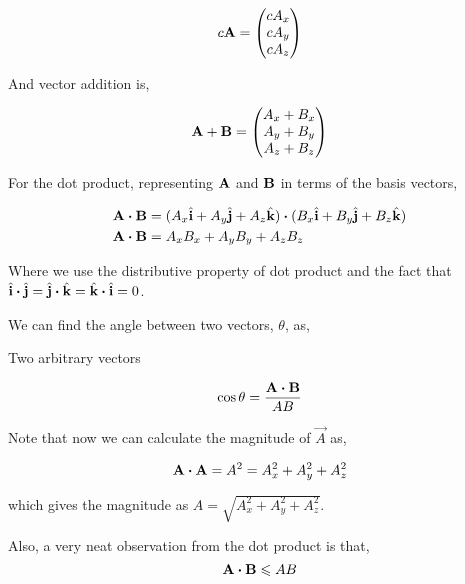 \[
    c\boldsymbol{\mathbf{A}} = 
    \begin{pmatrix}
        cA_x \\
        cA_y \\
        cA_z
    \end{pmatrix}
\]

And vector addition is,

\[
    \boldsymbol{\mathbf{A}} + \boldsymbol{\mathbf{B}} = 
    \begin{pmatrix}
        A_x + B_x\\
        A_y + B_y\\
        A_z + B_z 
    \end{pmatrix}
\]

For the dot product, representing \(\boldsymbol{\mathbf{A}}\) and \(\boldsymbol{\mathbf{B}}\) in terms of the basis vectors,

\begin{align*}
    \Aa \dtp \BB &= (A_x \unitv{i} + A_y \unitv{j} + A_z \unitv{k}) \dtp (B_x \unitv{i} + B_y \unitv{j} + B_z \unitv{k}) \\
    \Aa \dtp \BB &= A_xB_x + A_yB_y + A_zB_z
\end{align*}

Where we use the distributive property of dot product and the fact 
that \(\unitv{i} \dtp \unitv{j} = \unitv{j} \dtp \unitv{k} = \unitv{k} \dtp \unitv{i} = 0\).

We can find the angle between two vectors, \(\theta\), as,

\begin{marginfigure}
    \centering
    \caption{Two arbitrary vectors}
\end{marginfigure}

\begin{equation*}
    \cos\theta = \frac{\vec{A} \dtp \vec{B}}{AB}
\end{equation*}

Note that now we can calculate the magnitude of \(\vec{A}\) as, 

\begin{equation*}
    \vec{A} \dtp \vec{A} = A^2 = A_x^2 + A_y^2 + A_z^2
\end{equation*}

which gives the magnitude as \(A = \sqrt{A_x^2 + A_y^2 + A_z^2}\).

Also, a very neat observation from the dot product is that,
\begin{equation*}
    \vec{A} \dtp \vec{B} \le AB
\end{equation*}

